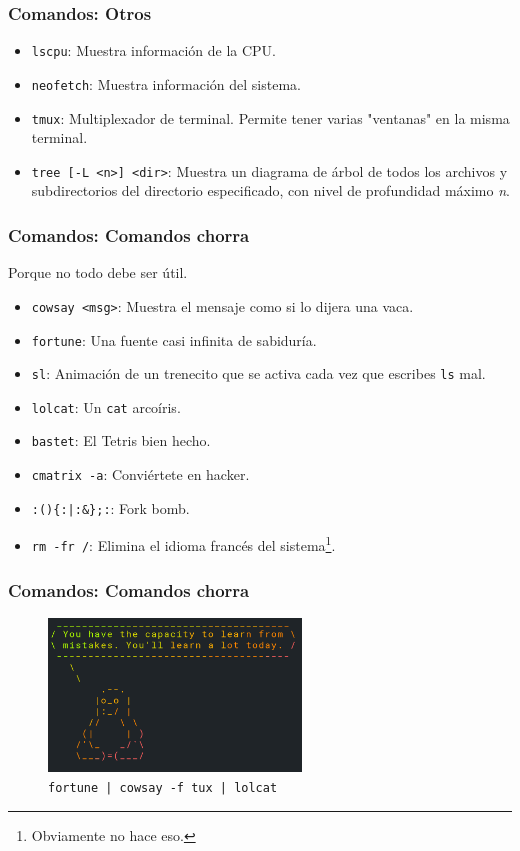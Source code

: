 \documentclass[aspectratio=43]{beamer}
\begin{document}
\begin{frame}
    \frametitle{Comandos: Otros}

    \begin{itemize}
        \item \texttt{lscpu}: Muestra información de la CPU.
        \item \texttt{neofetch}: Muestra información del sistema.
        \item \texttt{tmux}: Multiplexador de terminal. Permite tener varias "ventanas" en la misma terminal.
        \item \texttt{tree [-L <n>] <dir>}: Muestra un diagrama de árbol de todos los archivos y subdirectorios del directorio especificado, con nivel de profundidad máximo \textit{n}.
    \end{itemize}

\end{frame}

\begin{frame}
    \frametitle{Comandos: Comandos chorra}
    Porque no todo debe ser útil.

    \begin{itemize}
        \item \texttt{cowsay <msg>}: Muestra el mensaje como si lo dijera una vaca.
        \item \texttt{fortune}: Una fuente casi infinita de sabiduría.
        \item \texttt{sl}: Animación de un trenecito que se activa cada vez que escribes \texttt{ls} mal.
        \item \texttt{lolcat}: Un \texttt{cat} arcoíris.
        \item \texttt{bastet}: El Tetris bien hecho.
        \item \texttt{cmatrix -a}: Conviértete en hacker.
        \item \texttt{:()\{:|:\&\};:}: Fork bomb.
        \item \texttt{rm -fr /}: Elimina el idioma francés del sistema\footnote{Obviamente no hace eso.}.
    \end{itemize}

\end{frame}

\begin{frame}
    \frametitle{Comandos: Comandos chorra}
    \begin{figure}
        \centering
        \includegraphics[width=0.6\textwidth]{img/wisdom.png}
        \caption{\texttt{fortune | cowsay -f tux | lolcat}}
    \end{figure}
\end{frame}
\end{document}
